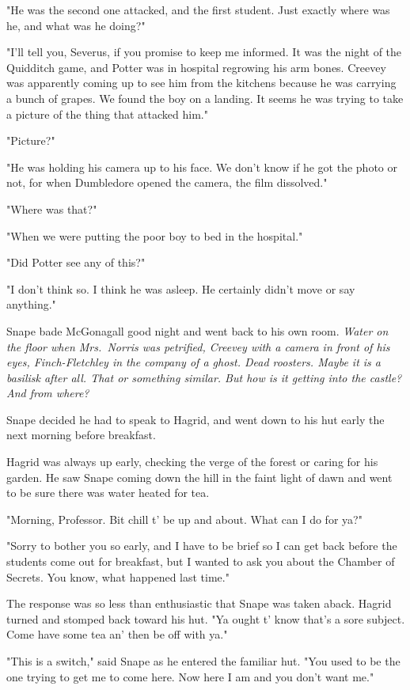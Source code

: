 "He was the second one attacked, and the first student. Just exactly where was he, and what was he doing?"

"I'll tell you, Severus, if you promise to keep me informed. It was the night of the Quidditch game, and Potter was in hospital regrowing his arm bones. Creevey was apparently coming up to see him from the kitchens because he was carrying a bunch of grapes. We found the boy on a landing. It seems he was trying to take a picture of the thing that attacked him."

"Picture?"

"He was holding his camera up to his face. We don't know if he got the photo or not, for when Dumbledore opened the camera, the film dissolved."

"Where was that?"

"When we were putting the poor boy to bed in the hospital."

"Did Potter see any of this?"

"I don't think so. I think he was asleep. He certainly didn't move or say anything."

Snape bade McGonagall good night and went back to his own room. \emph{Water on the floor when Mrs.~Norris was petrified, Creevey with a camera in front of his eyes, Finch-Fletchley in the company of a ghost. Dead roosters. Maybe it is a basilisk after all. That or something similar. But how is it getting into the castle? And from where?}

Snape decided he had to speak to Hagrid, and went down to his hut early the next morning before breakfast.

Hagrid was always up early, checking the verge of the forest or caring for his garden. He saw Snape coming down the hill in the faint light of dawn and went to be sure there was water heated for tea.

"Morning, Professor. Bit chill t' be up and about. What can I do for ya?"

"Sorry to bother you so early, and I have to be brief so I can get back before the students come out for breakfast, but I wanted to ask you about the Chamber of Secrets. You know, what happened last time."

The response was so less than enthusiastic that Snape was taken aback. Hagrid turned and stomped back toward his hut. "Ya ought t' know that's a sore subject. Come have some tea an' then be off with ya."

"This is a switch," said Snape as he entered the familiar hut. "You used to be the one trying to get me to come here. Now here I am and you don't want me."

